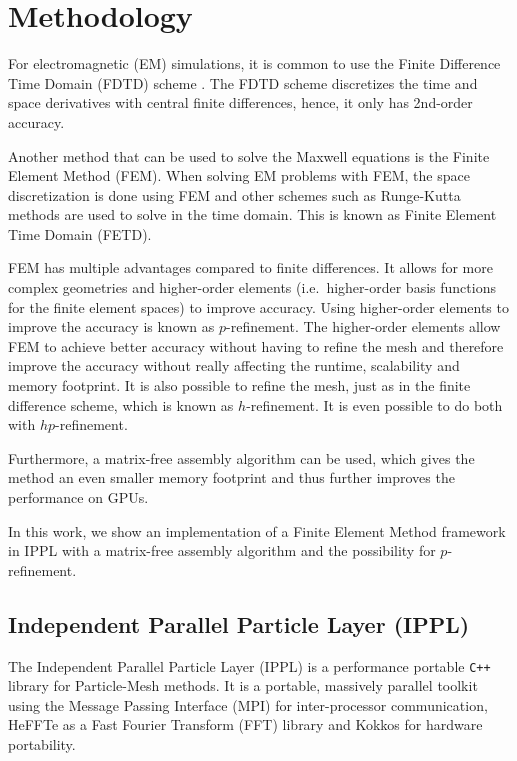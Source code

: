 \chapter{Methodology}

For electromagnetic (EM) simulations, it is common to use the Finite Difference Time Domain (FDTD) scheme \cite{yee_finite-difference_1997}.
The FDTD scheme discretizes the time and space derivatives with central finite differences, hence, it only has 2nd-order accuracy.

Another method that can be used to solve the Maxwell equations is the Finite Element Method (FEM).
When solving EM problems with FEM, the space discretization is done using FEM
and other schemes such as Runge-Kutta methods are used to solve in the time domain.
This is known as Finite Element Time Domain (FETD).

FEM has multiple advantages compared to finite differences. It allows for more complex geometries
and higher-order elements (i.e.\ higher-order basis functions for the finite element spaces) to improve accuracy.
Using higher-order elements to improve the accuracy is known as $p$-refinement.
The higher-order elements allow FEM to achieve better accuracy without having to refine the mesh
and therefore improve the accuracy without really affecting the runtime, scalability and memory footprint.
It is also possible to refine the mesh, just as in the finite difference scheme,
which is known as $h$-refinement. It is even possible to do both with $hp$-refinement.

Furthermore, a matrix-free assembly algorithm can be used, which gives the method an even smaller memory footprint
and thus further improves the performance on GPUs.

In this work, we show an implementation of a Finite Element Method framework in IPPL \cite{frey_ippl-frameworkippl_2023}
with a matrix-free assembly algorithm and the possibility for $p$-refinement.







\section{Independent Parallel Particle Layer (IPPL)}

The Independent Parallel Particle Layer (IPPL) \cite{frey_ippl-frameworkippl_2023} \cite{muralikrishnan_scaling_2022}
is a performance portable \texttt{C++} library for Particle-Mesh methods.
It is a portable, massively parallel toolkit using the Message Passing Interface (MPI) for inter-processor communication,
HeFFTe \cite{ayala_heffte_2020} as a Fast Fourier Transform (FFT) library and Kokkos \cite{carter_edwards_kokkos_2014} for hardware portability.


